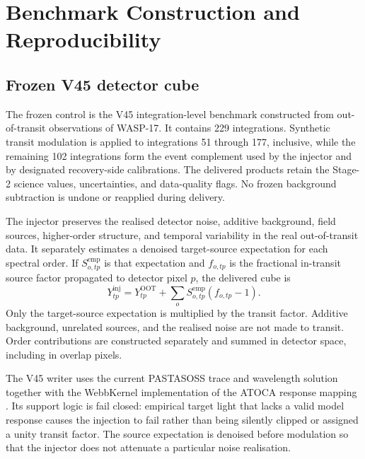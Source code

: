 \section{Benchmark Construction and Reproducibility}
\label{app:benchmarking}

\subsection{Frozen V45 detector cube}

The frozen control is the V45 integration-level benchmark constructed from
out-of-transit observations of WASP-17. It contains 229 integrations. Synthetic
transit modulation is applied to integrations 51 through 177, inclusive, while
the remaining 102 integrations form the event complement used by the injector
and by designated recovery-side calibrations. The delivered products retain the
Stage-2 science values, uncertainties, and data-quality flags. No frozen
background subtraction is undone or reapplied during delivery.

The injector preserves the realised detector noise, additive background, field
sources, higher-order structure, and temporal variability in the real
out-of-transit data. It separately estimates a denoised target-source expectation
for each spectral order. If $S^{\mathrm{emp}}_{o,tp}$ is that expectation and
$f_{o,tp}$ is the fractional in-transit source factor propagated to detector
pixel $p$, the delivered cube is
\begin{equation}
 Y^{\mathrm{inj}}_{tp}=Y^{\mathrm{OOT}}_{tp}
 +\sum_o S^{\mathrm{emp}}_{o,tp}\left(f_{o,tp}-1\right).
 \label{eq:v45-injector}
\end{equation}
Only the target-source expectation is multiplied by the transit factor.
Additive background, unrelated sources, and the realised noise are not made to
transit. Order contributions are constructed separately and summed in detector
space, including in overlap pixels.

The V45 writer uses the current PASTASOSS trace and wavelength solution
\citep{BainesEtAl2023Trace,BainesEtAl2023Wavelength} together with the
WebbKernel implementation of the ATOCA response mapping
\citep{DarveauBernierEtAl2022,JWSTPipeline2025}. Its support logic is fail
closed: empirical target light that lacks a valid model response causes the
injection to fail rather than being silently clipped or assigned a unity
transit factor. The source expectation is denoised before modulation so that
the injector does not attenuate a particular noise realisation.

